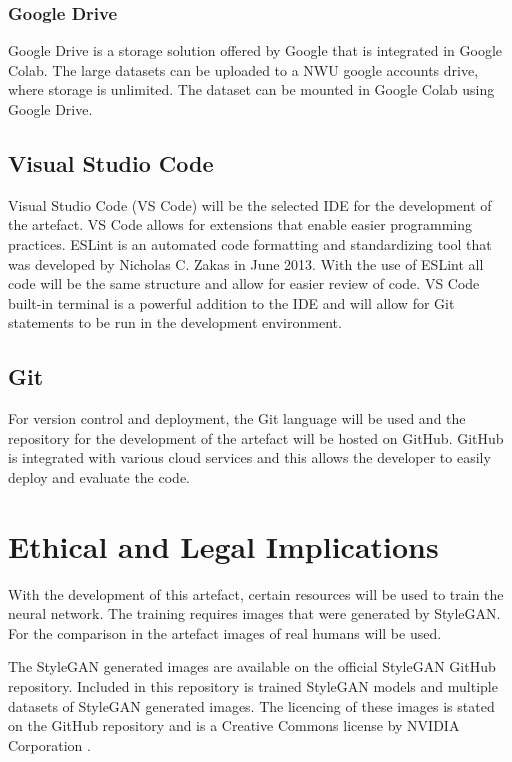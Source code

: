 \subsubsection{Google Drive}

Google Drive is a storage solution offered by Google that is integrated in Google Colab. The large datasets can be uploaded to a NWU google accounts drive, where storage is unlimited. The dataset can be mounted in Google Colab using Google Drive.

\subsection{Visual Studio Code}

Visual Studio Code (VS Code) will be the selected IDE for the development of the artefact. VS Code allows for extensions that enable easier programming practices. ESLint is an automated code formatting and standardizing tool that was developed by Nicholas C. Zakas in June 2013. With the use of ESLint all code will be the same structure and allow for easier review of code. VS Code built-in terminal is a powerful addition to the IDE and will allow for Git statements to be run in the development environment.

\subsection{Git}

For version control and deployment, the Git language will be used and the repository for the development of the artefact will be hosted on GitHub. GitHub is integrated with various cloud services and this allows the developer to easily deploy and evaluate the code.

\section{Ethical and Legal Implications}

With the development of this artefact, certain resources will be used to train the neural network. The training requires images that were generated by StyleGAN. For the comparison in the artefact images of real humans will be used.

The StyleGAN generated images are available on the official StyleGAN GitHub repository. Included in this repository is trained StyleGAN models and multiple datasets of StyleGAN generated images. The licencing of these images is stated on the GitHub repository and is a Creative Commons license by NVIDIA Corporation \citep{Karras2019}.

